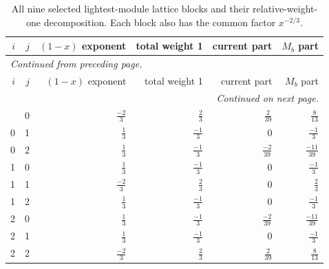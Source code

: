 \begingroup\small
\setlength{\tabcolsep}{5pt}
\begin{longtable}{rrrrrr}
\caption{All nine selected lightest-module lattice blocks and their relative-weight-one decomposition. Each block also has the common factor $x^{-2/3}$.}\label{expphysics:lightest-blocks}\\
\toprule
$i$ & $j$ & $(1-x)$ exponent & total weight 1 & current part & $M_b$ part\\
\midrule
\endfirsthead
\multicolumn{6}{l}{\small\itshape Continued from preceding page.}\\
\toprule
$i$ & $j$ & $(1-x)$ exponent & total weight 1 & current part & $M_b$ part\\
\midrule
\endhead
\midrule
\multicolumn{6}{r}{\small\itshape Continued on next page.}\\
\endfoot
\bottomrule
\endlastfoot
0 & 0 & $\frac{-2}{3}$ & $\frac{2}{3}$ & $\frac{2}{39}$ & $\frac{8}{13}$\\
0 & 1 & $\frac{1}{3}$ & $\frac{-1}{3}$ & $0$ & $\frac{-1}{3}$\\
0 & 2 & $\frac{1}{3}$ & $\frac{-1}{3}$ & $\frac{-2}{39}$ & $\frac{-11}{39}$\\
1 & 0 & $\frac{1}{3}$ & $\frac{-1}{3}$ & $0$ & $\frac{-1}{3}$\\
1 & 1 & $\frac{-2}{3}$ & $\frac{2}{3}$ & $0$ & $\frac{2}{3}$\\
1 & 2 & $\frac{1}{3}$ & $\frac{-1}{3}$ & $0$ & $\frac{-1}{3}$\\
2 & 0 & $\frac{1}{3}$ & $\frac{-1}{3}$ & $\frac{-2}{39}$ & $\frac{-11}{39}$\\
2 & 1 & $\frac{1}{3}$ & $\frac{-1}{3}$ & $0$ & $\frac{-1}{3}$\\
2 & 2 & $\frac{-2}{3}$ & $\frac{2}{3}$ & $\frac{2}{39}$ & $\frac{8}{13}$\\
\end{longtable}
\endgroup
